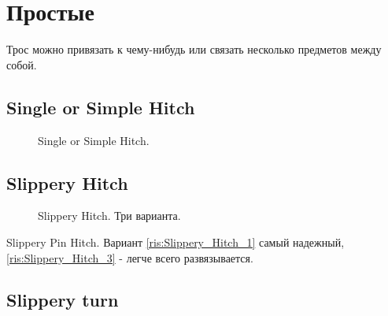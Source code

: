 \section{Простые}

Трос можно привязать к чему-нибудь или связать несколько предметов между собой.

\subsection{Single or Simple Hitch}

\begin{figure}[H]\centering
	\begin{minipage}{1\linewidth}
		\begin{center}
			\tcbox[enhanced jigsaw,colframe=black,opacityframe=0.5,opacityback=0.5]
			{\centering{}}
		\end{center}
	\end{minipage}
\caption{Single or Simple Hitch.}
\label{ris:Single_or_Simple_Hitch}
\end{figure}

\subsection{Slippery Hitch}

\begin{figure}[H]\centering
\hfil
\hfil
	\caption{Slippery Hitch. Три варианта.}\label{ris:Slippery_Hitch}
\end{figure}

Slippery Pin Hitch. Вариант \ref{ris:Slippery_Hitch_1} самый надежный, \ref{ris:Slippery_Hitch_3} - легче всего развязывается.

\subsection{Slippery turn}

